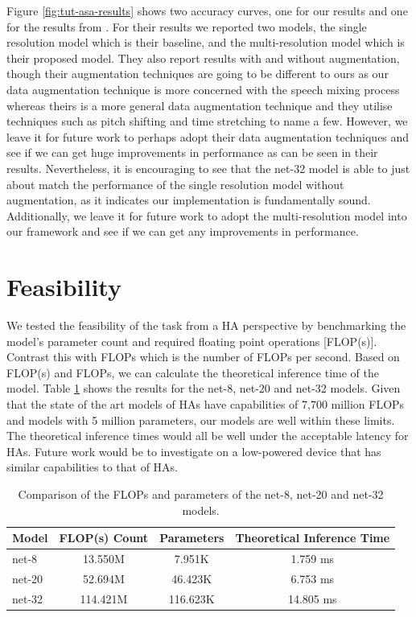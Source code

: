 \documentclass[logo,bsc,singlespacing,parskip,online]{infthesis}
\begin{document}
Figure \ref{fig:tut-asa-results} shows two accuracy curves, one for our results 
and one for the results from \citet{schindler_multi-temporal_2018}. For their results 
we reported two models, the single resolution model which is their baseline, 
and the multi-resolution model which is their proposed model. They also 
report results with and without augmentation, though their augmentation techniques 
are going to be different to ours as our data augmentation technique is more 
concerned with the speech mixing process whereas theirs is a more general 
data augmentation technique and they utilise techniques such as pitch shifting and 
time stretching to name a few. However, we leave it for future work 
to perhaps adopt their data augmentation techniques and see 
if we can get huge improvements in performance as can be seen in their results.
Nevertheless, it is encouraging to see 
that the net-32 model is able to just about match the performance of the single resolution model 
without augmentation, as it indicates our implementation is fundamentally sound. Additionally, we 
leave it for future work to adopt the multi-resolution model into our framework and see 
if we can get any improvements in performance.

\section{Feasibility} 
We tested the feasibility of the task from a HA perspective by benchmarking 
the model's parameter count and required floating point operations [FLOP(s)].
Contrast this with FLOPs which is the number of FLOPs per second. Based on 
FLOP(s) and FLOPs, we can calculate the theoretical inference time of the model.
Table \ref{tab:model-comparison} shows the results for the net-8, net-20 and net-32 models.
Given that the state of the art models of HAs have capabilities of 
7,700 million FLOPs and models with 5 million parameters, our models are well within these limits.
The theoretical inference times would all be well under the acceptable latency for HAs.
Future work would be to investigate on a low-powered device that has similar 
capabilities to that of HAs. 

\begin{table}[h]
   \centering
   \begin{tabular}{lccc}
      \toprule
      Model & FLOP(s) Count & Parameters & Theoretical Inference Time\footnotemark \\
      \midrule
      net-8 & 13.550M & 7.951K & 1.759 ms \\ %
      net-20 & 52.694M & 46.423K & 6.753 ms \\ %
      net-32 & 114.421M & 116.623K & 14.805 ms \\ %
      \bottomrule
   \end{tabular}
   \caption{{Comparison of the FLOPs and parameters of the net-8, net-20 and net-32 models.}}
   \label{tab:model-comparison}
\end{table}
\end{document}
